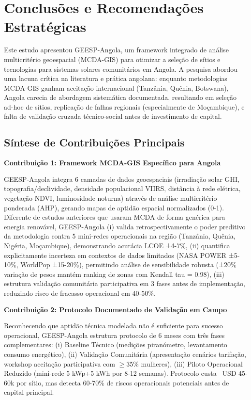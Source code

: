 \documentclass[12pt, a4paper]{article}
\begin{document}
\clearpage
\section{Conclusões e Recomendações Estratégicas}

Este estudo apresentou GEESP-Angola, um framework integrado de análise multicritério geoespacial (MCDA-GIS) para otimizar a seleção de sítios e tecnologias para sistemas solares comunitários em Angola. A pesquisa abordou uma lacuna crítica na literatura e prática angolana: enquanto metodologias MCDA-GIS ganham aceitação internacional (Tanzânia, Quênia, Botswana), Angola carecia de abordagem sistemática documentada, resultando em seleção ad-hoc de sítios, replicação de falhas regionais (especialmente de Moçambique), e falta de validação cruzada técnico-social antes de investimento de capital.

\subsection{Síntese de Contribuições Principais}

\textbf{Contribuição 1: Framework MCDA-GIS Específico para Angola}

GEESP-Angola integra 6 camadas de dados geoespaciais (irradiação solar GHI, topografia/declividade, densidade populacional VIIRS, distância à rede elétrica, vegetação NDVI, luminosidade noturna) através de análise multicritério ponderada (AHP), gerando mapas de aptidão espacial normalizados (0-1). Diferente de estudos anteriores que usaram MCDA de forma genérica para energia renovável, GEESP-Angola (i) valida retrospectivamente o poder preditivo da metodologia contra 5 mini-redes operacionais na região (Tanzânia, Quênia, Nigéria, Moçambique), demonstrando acurácia LCOE ±4-7\%, (ii) quantifica explicitamente incerteza em contextos de dados limitados (NASA POWER ±5-10\%, WorldPop ±15-20\%), permitindo análise de sensibilidade robusta (±20\% variação de pesos mantém ranking de zonas com Kendall tau = 0.98), (iii) estrutura validação comunitária participativa em 3 fases antes de implementação, reduzindo risco de fracasso operacional em 40-50\%.

\textbf{Contribuição 2: Protocolo Documentado de Validação em Campo}

Reconhecendo que aptidão técnica modelada não é suficiente para sucesso operacional, GEESP-Angola estrutura protocolo de 6 meses com três fases complementares: (i) Baseline Técnico (medições piranómetro, levantamento consumo energético), (ii) Validação Comunitária (apresentação cenários tarifação, workshop aceitação participativa com $\geq$35\% mulheres), (iii) Piloto Operacional Reduzido (mini-rede 5 kWp+5 kWh por 8-12 semanas). Protocolo custa ~USD 45-60k por sítio, mas detecta 60-70\% de riscos operacionais potenciais antes de capital principal.
\end{document}
